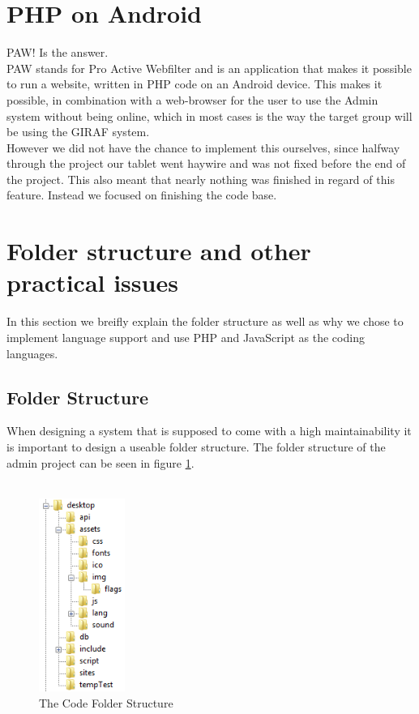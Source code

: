 \section{PHP on Android}
PAW! Is the answer.\\
PAW stands for Pro Active Webfilter and is an application that makes it possible to run a website, written in PHP code on an Android device. This makes it possible, in combination with a web-browser for the user to use the Admin system without being online, which in most cases is the way the target group will be using the GIRAF system.\\
However we did not have the chance to implement this ourselves, since halfway through the project our tablet went haywire and was not fixed before the end of the project. This also meant that nearly nothing was finished in regard of this feature. Instead we focused on finishing the code base.

\section{Folder structure and other practical issues}
In this section we breifly explain the folder structure as well as why we chose to implement language support and use PHP and JavaScript as the coding languages.

\subsection{Folder Structure}
When designing a system that is supposed to come with a high maintainability it is important to design a useable folder structure. The folder structure of the admin project can be seen in figure \ref{fig:folderStructure}.\\
\\

\begin{figure}[htbp]
	\centering
		\includegraphics[width=0.25\textwidth]{images/folderStructure.png}
	\caption{The Code Folder Structure}
	\label{fig:folderStructure}
\end{figure}


